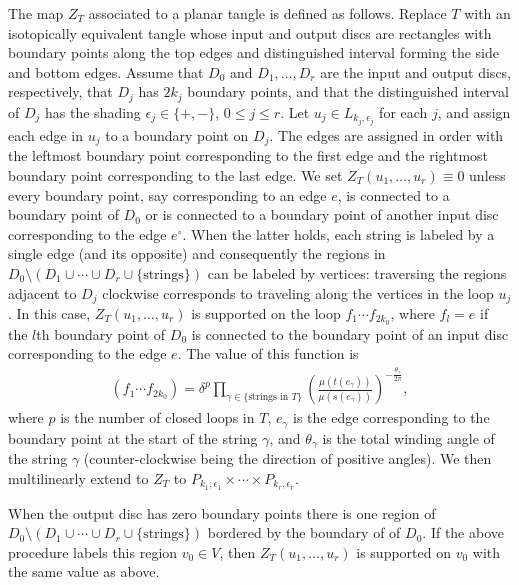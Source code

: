 The map $Z_T$ associated to a planar tangle is defined as follows. Replace $T$ with an isotopically equivalent tangle whose input and output discs are rectangles with boundary points along the top edges and distinguished interval forming the side and bottom edges. Assume that $D_0$ and $D_1,\ldots, D_r$ are the input and output discs, respectively, that $D_j$ has $2k_j$ boundary points, and that the distinguished interval of $D_j$ has the shading $\epsilon_j\in \{+,-\}$, $0\leq j\leq r$. Let $u_j\in L_{k_j,\epsilon_j}$ for each $j$, and assign each edge in $u_j$ to a boundary point on $D_j$. The edges are assigned in order with the leftmost boundary point corresponding to the first edge and the rightmost boundary point corresponding to the last edge. We set $Z_T(u_1,\ldots, u_r)\equiv 0$ unless every boundary point, say corresponding to an edge $e$, is connected to a boundary point of $D_0$ or is connected to a boundary point of another input disc corresponding to the edge $e^\circ$. When the latter holds, each string is labeled by a single edge (and its opposite) and consequently the regions in $D_0\setminus (D_1\cup\cdots\cup D_r\cup\{\text{strings}\})$ can be labeled by vertices: traversing the regions adjacent to $D_j$ clockwise corresponds to traveling along the vertices in the loop $u_j$. In this case, $Z_T(u_1,\ldots, u_r)$ is supported on the loop $f_1\cdots f_{2k_0}$, where $f_l=e$ if the $l$th boundary point of $D_0$ is connected to the boundary point of an input disc corresponding to the edge $e$. The value of this function is
	\begin{align*}
		[Z_T(u_1,\ldots, u_r)](f_1\cdots f_{2k_0}) =\delta^p \prod_{\gamma\in\{\text{strings in $T$}\}} \left(\frac{\mu(t(e_\gamma))}{\mu(s(e_\gamma))}\right)^{-\frac{\theta_\gamma}{2\pi}},
	\end{align*}
where $p$ is the number of closed loops in $T$, $e_\gamma$ is the edge corresponding to the boundary point at the start of the string $\gamma$, and $\theta_\gamma$ is the total winding angle of the string $\gamma$ (counter-clockwise being the direction of positive angles). We then multilinearly extend to $Z_T$ to $P_{k_1,\epsilon_1}\times\cdots\times P_{k_r,\epsilon_r}$.

When the output disc has zero boundary points there is one region of $D_0\setminus (D_1\cup\cdots\cup D_r\cup\{\text{strings}\})$ bordered by the boundary of of $D_0$. If the above procedure labels this region $v_0\in V$, then $Z_T(u_1,\ldots, u_r)$ is supported on $v_0$ with the same value as above.

